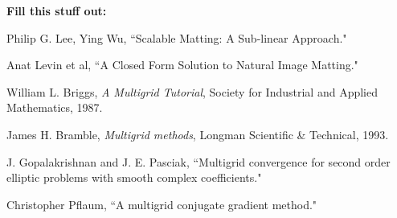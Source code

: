 \textbf{Fill this stuff out:}

\begin{thebibliography}{9}
	Philip G. Lee, Ying Wu,
	``Scalable Matting: A Sub-linear Approach."
	
	Anat Levin et al,
	``A Closed Form Solution to Natural Image Matting."
 
	William L. Briggs, \textit{A Multigrid Tutorial},
	Society for Industrial and Applied Mathematics, 1987.
	
	James H. Bramble, \textit{Multigrid methods},
	Longman Scientific \& Technical, 1993.
	
	J. Gopalakrishnan and J. E. Pasciak,
	``Multigrid convergence for
second order elliptic problems with smooth complex coefficients."

	
	Christopher Pflaum,
	``A multigrid conjugate gradient method."

\end{thebibliography}